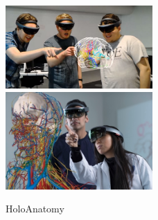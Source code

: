 \begin{figure}[ht]
    \includegraphics[width=0.5\textwidth]{fig/holoanatomy1}
    \includegraphics[trim={0 1.76cm 0 0},clip,width=0.5\textwidth]{fig/holoanatomy2}
    \caption{HoloAnatomy}
    
\end{figure}